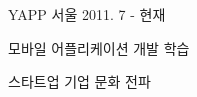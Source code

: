 \begin{cventries}
  \cventry
    {}
    {YAPP}
    {서울}
    {2011. 7 - 현재}
    {
      \begin{cvitems}
        \item {모바일 어플리케이션 개발 학습}
        \item {스타트업 기업 문화 전파}
      \end{cvitems}
    }
\end{cventries}
